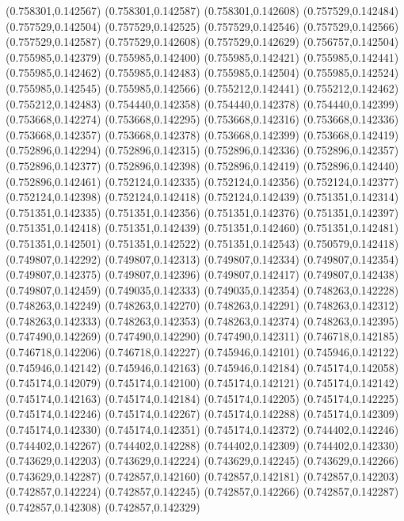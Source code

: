 (0.758301,0.142567)
(0.758301,0.142587)
(0.758301,0.142608)
(0.757529,0.142484)
(0.757529,0.142504)
(0.757529,0.142525)
(0.757529,0.142546)
(0.757529,0.142566)
(0.757529,0.142587)
(0.757529,0.142608)
(0.757529,0.142629)
(0.756757,0.142504)
(0.755985,0.142379)
(0.755985,0.142400)
(0.755985,0.142421)
(0.755985,0.142441)
(0.755985,0.142462)
(0.755985,0.142483)
(0.755985,0.142504)
(0.755985,0.142524)
(0.755985,0.142545)
(0.755985,0.142566)
(0.755212,0.142441)
(0.755212,0.142462)
(0.755212,0.142483)
(0.754440,0.142358)
(0.754440,0.142378)
(0.754440,0.142399)
(0.753668,0.142274)
(0.753668,0.142295)
(0.753668,0.142316)
(0.753668,0.142336)
(0.753668,0.142357)
(0.753668,0.142378)
(0.753668,0.142399)
(0.753668,0.142419)
(0.752896,0.142294)
(0.752896,0.142315)
(0.752896,0.142336)
(0.752896,0.142357)
(0.752896,0.142377)
(0.752896,0.142398)
(0.752896,0.142419)
(0.752896,0.142440)
(0.752896,0.142461)
(0.752124,0.142335)
(0.752124,0.142356)
(0.752124,0.142377)
(0.752124,0.142398)
(0.752124,0.142418)
(0.752124,0.142439)
(0.751351,0.142314)
(0.751351,0.142335)
(0.751351,0.142356)
(0.751351,0.142376)
(0.751351,0.142397)
(0.751351,0.142418)
(0.751351,0.142439)
(0.751351,0.142460)
(0.751351,0.142481)
(0.751351,0.142501)
(0.751351,0.142522)
(0.751351,0.142543)
(0.750579,0.142418)
(0.749807,0.142292)
(0.749807,0.142313)
(0.749807,0.142334)
(0.749807,0.142354)
(0.749807,0.142375)
(0.749807,0.142396)
(0.749807,0.142417)
(0.749807,0.142438)
(0.749807,0.142459)
(0.749035,0.142333)
(0.749035,0.142354)
(0.748263,0.142228)
(0.748263,0.142249)
(0.748263,0.142270)
(0.748263,0.142291)
(0.748263,0.142312)
(0.748263,0.142333)
(0.748263,0.142353)
(0.748263,0.142374)
(0.748263,0.142395)
(0.747490,0.142269)
(0.747490,0.142290)
(0.747490,0.142311)
(0.746718,0.142185)
(0.746718,0.142206)
(0.746718,0.142227)
(0.745946,0.142101)
(0.745946,0.142122)
(0.745946,0.142142)
(0.745946,0.142163)
(0.745946,0.142184)
(0.745174,0.142058)
(0.745174,0.142079)
(0.745174,0.142100)
(0.745174,0.142121)
(0.745174,0.142142)
(0.745174,0.142163)
(0.745174,0.142184)
(0.745174,0.142205)
(0.745174,0.142225)
(0.745174,0.142246)
(0.745174,0.142267)
(0.745174,0.142288)
(0.745174,0.142309)
(0.745174,0.142330)
(0.745174,0.142351)
(0.745174,0.142372)
(0.744402,0.142246)
(0.744402,0.142267)
(0.744402,0.142288)
(0.744402,0.142309)
(0.744402,0.142330)
(0.743629,0.142203)
(0.743629,0.142224)
(0.743629,0.142245)
(0.743629,0.142266)
(0.743629,0.142287)
(0.742857,0.142160)
(0.742857,0.142181)
(0.742857,0.142203)
(0.742857,0.142224)
(0.742857,0.142245)
(0.742857,0.142266)
(0.742857,0.142287)
(0.742857,0.142308)
(0.742857,0.142329)
